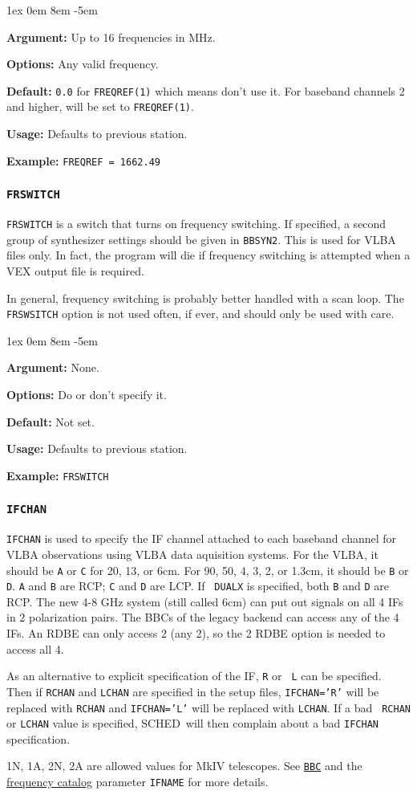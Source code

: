 \documentclass{report}
\newcommand{\schedb}{{\sc SCHED~}}
\newcommand{\rcwbox}[5]{
  \begin{list}{}{\parsep 1ex  \itemsep 0em
                 \leftmargin 8em  \itemindent -5em }
    \item {\bf Argument:} #1
    \item {\bf Options:}  #2
    \item {\bf Default:}  #3
    \item {\bf Usage:}    #4
    \item {\bf Example:}  #5
  \end{list}
}
\begin{document}
\rcwbox
{Up to 16 frequencies in MHz.}
{Any valid frequency.}
{{\tt 0.0} for {\tt FREQREF(1)} which means don't use it. For baseband
channels 2 and higher, will be set to {\tt FREQREF(1)}.}
{Defaults to previous station.}
{{\tt FREQREF = 1662.49}}


\subsubsection{\label{SP:FRSWITCH}{\tt FRSWITCH}}

{\tt FRSWITCH} is a switch that turns on frequency switching. If
specified, a second group of synthesizer settings should be given in
{\tt BBSYN2}. This is used for VLBA files only.  In fact, the program
will die if frequency switching is attempted when a VEX output
file is required.

In general, frequency switching is probably better handled with a
scan loop.  The {\tt FRSWSITCH} option is not used often, if ever, and
should only be used with care.

\rcwbox
{None.}
{Do or don't specify it.}
{Not set.}
{Defaults to previous station.}
{{\tt FRSWITCH}}


\subsubsection{\label{SP:IFCHAN}{\tt IFCHAN}}

{\tt IFCHAN} is used to specify the IF channel attached to each
baseband channel for VLBA observations using VLBA data aquisition
systems.  For the VLBA, it should be {\tt A} or {\tt C} for 20, 13, or
6cm.  For 90, 50, 4, 3, 2, or 1.3cm, it should be {\tt B} or {\tt D}.
{\tt A} and {\tt B} are RCP; {\tt C} and {\tt D} are LCP. If {\tt
DUALX} is specified, both {\tt B} and {\tt D} are RCP. The new 4-8 GHz
system (still called 6cm) can put out signals on all 4 IFs in 2
polarization pairs.  The BBCs of the legacy backend can access any
of the 4 IFs.  An RDBE can only access 2 (any 2), so the 2 RDBE
option is needed to access all 4.  

As an alternative to explicit specification of the IF, {\tt R} or {\tt
L} can be specified. Then if {\tt RCHAN} and {\tt LCHAN} are specified
in the setup files, {\tt IFCHAN='R'} will be replaced with {\tt RCHAN}
and {\tt IFCHAN='L'} will be replaced with {\tt LCHAN}.  If a bad {\tt
RCHAN} or {\tt LCHAN} value is specified, \schedb will then complain
about a bad {\tt IFCHAN} specification.

1N, 1A, 2N, 2A are allowed values for MkIV telescopes.
See 
{\hyperref[SP:BBC]{{\tt BBC}}} and the 
{\hyperref[SEC:FRQCAT]{frequency catalog}}
parameter {\tt IFNAME} for more details.
\end{document}

